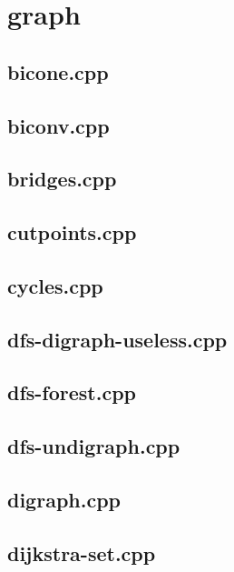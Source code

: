 \section{graph}

\subsection{bicone.cpp}


\subsection{biconv.cpp}


\subsection{bridges.cpp}


\subsection{cutpoints.cpp}


\subsection{cycles.cpp}


\subsection{dfs-digraph-useless.cpp}


\subsection{dfs-forest.cpp}


\subsection{dfs-undigraph.cpp}


\subsection{digraph.cpp}


\subsection{dijkstra-set.cpp}



